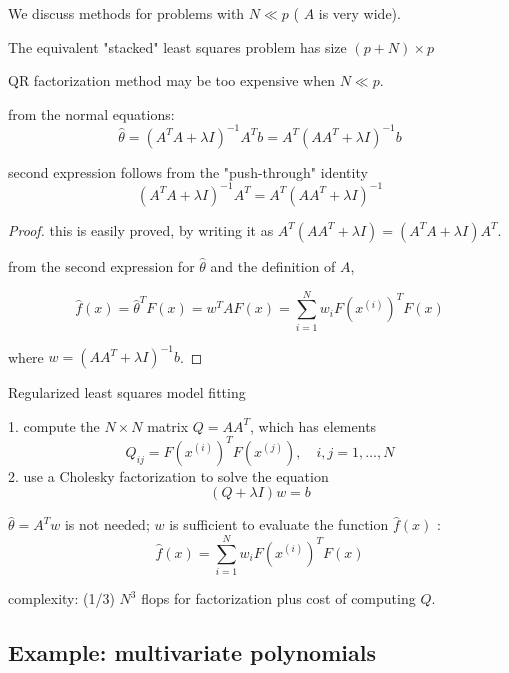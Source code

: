 We discuss methods for problems with $N \ll p$ ( $A$ is very wide).

\begin{theorem}
    The equivalent "stacked" least squares problem has size $(p+N) \times p$
\end{theorem}

\begin{remark}
    QR factorization method may be too expensive when $N \ll p$.
\end{remark}

\begin{theorem}
    from the normal equations:
$$
\hat{\theta}=\left(A^{T} A+\lambda I\right)^{-1} A^{T} b=A^{T}\left(A A^{T}+\lambda I\right)^{-1} b
$$

second expression follows from the "push-through" identity
$$
\left(A^{T} A+\lambda I\right)^{-1} A^{T}=A^{T}\left(A A^{T}+\lambda I\right)^{-1}
$$
\end{theorem}

\begin{proof}
    this is easily proved, by writing it as $A^{T}\left(A A^{T}+\lambda I\right)=\left(A^{T} A+\lambda I\right) A^{T}$.

    from the second expression for $\hat{\theta}$ and the definition of $A$,

    $$
    \hat{f}(x)=\hat{\theta}^{T} F(x)=w^{T} A F(x)=\sum_{i=1}^{N} w_{i} F\left(x^{(i)}\right)^{T} F(x)
    $$

    where $w=\left(A A^{T}+\lambda I\right)^{-1} b$.
\end{proof}


\begin{algorithm}
    \caption{Regularized least squares model fitting}
    1. compute the $N \times N$ matrix $Q=A A^{T}$, which has elements
$$
Q_{i j}=F\left(x^{(i)}\right)^{T} F\left(x^{(j)}\right), \quad i, j=1, \ldots, N
$$
2. use a Cholesky factorization to solve the equation
$$
(Q+\lambda I) w=b
$$
\end{algorithm}

\begin{remark}
    $\hat{\theta}=A^{T} w$ is not needed; $w$ is sufficient to evaluate the function $\hat{f}(x)$ :
$$
\hat{f}(x)=\sum_{i=1}^{N} w_{i} F\left(x^{(i)}\right)^{T} F(x)
$$
\end{remark}

complexity: (1/3) $N^{3}$ flops for factorization plus cost of computing $Q$.

\subsection{Example: multivariate polynomials}

